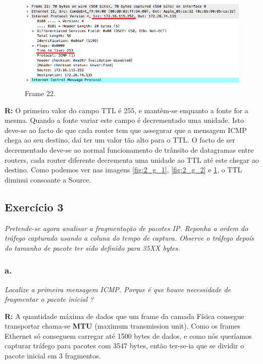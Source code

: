 \documentclass{llncs}
\begin{document}
\begin{figure}[H]
\begin{center}
\includegraphics[scale=0.45]{2_g_3.png} 
\end{center}
\caption{\label{fig:2_g_3}Frame 22.}
\end{figure}

\textbf{R:} O primeiro valor do campo TTL é 255, e mantêm-se enquanto a fonte for a mesma. Quando a fonte variar este campo é decrementado uma unidade. Isto deve-se ao facto de que cada router tem que assegurar que a mensagem ICMP chega ao seu destino, daí ter um valor tão alto para o TTL. O facto de ser decrementado deve-se ao normal funcionamento de trânsito de datagramas entre routers, cada router diferente decrementa uma unidade ao TTL até este chegar ao destino. Como podemos ver nas imagens \ref{fig:2_g_1}, \ref{fig:2_g_2} e \ref{fig:2_g_3}, o TTL diminui consoante a Source.

\subsection{Exercício 3}
\emph{Pretende-se agora analisar a 
fragmentação de
pacotes
IP. 
Reponha a ordem
do 
tráfego  capturado
usando  a  coluna  do  tempo
de  captura. 
Observe  o  tráfego 
depois do tamanho de
pacote ter sido definido para 35XX bytes.  }

\subsubsection{a.}
\emph{Localize
a primeira mensagem 
ICMP. Porque 
é que 
houve
necessidade de 
fragmentar o pacote inicial
?}
\\ \par
\textbf{R:} A quantidade máxima de dados que um frame da camada Física consegue transportar chama-se  \textbf{MTU} (maximum transmission unit). Como os frames Ethernet só conseguem carregar até 1500 bytes de dados, e como nós queríamos capturar tráfego para pacotes com 3547 bytes, então ter-se-ia que se dividir o pacote inicial em 3 fragmentos.
\end{document}
